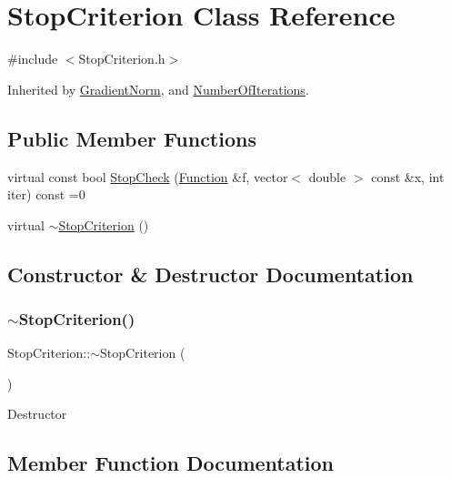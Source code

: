 \hypertarget{class_stop_criterion}{}\section{Stop\+Criterion Class Reference}
\label{class_stop_criterion}


{\ttfamily \#include $<$Stop\+Criterion.\+h$>$}



Inherited by \hyperlink{class_gradient_norm}{Gradient\+Norm}, and \hyperlink{class_number_of_iterations}{Number\+Of\+Iterations}.

\subsection*{Public Member Functions}
\begin{DoxyCompactItemize}
\item 
virtual const bool \hyperlink{class_stop_criterion_a9478e74e48a725ed151328488d709129}{Stop\+Check} (\hyperlink{class_function}{Function} \&f, vector$<$ double $>$ const \&x, int iter) const =0
\item 
virtual \hyperlink{class_stop_criterion_a009452a691d0e944d384125c40bae021}{$\sim$\+Stop\+Criterion} ()
\end{DoxyCompactItemize}


\subsection{Constructor \& Destructor Documentation}
\mbox{\label{class_stop_criterion_a009452a691d0e944d384125c40bae021}} 
\subsubsection{\texorpdfstring{$\sim$\+Stop\+Criterion()}{~StopCriterion()}}
{\footnotesize\ttfamily Stop\+Criterion\+::$\sim$\+Stop\+Criterion (\begin{DoxyParamCaption}{ }\end{DoxyParamCaption})\hspace{0.3cm}{\ttfamily [virtual]}}

Destructor 

\subsection{Member Function Documentation}
\mbox{\label{class_stop_criterion_a9478e74e48a725ed151328488d709129}} 
